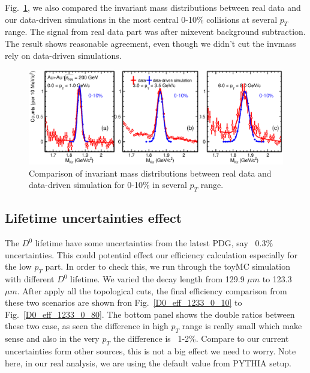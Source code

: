 Fig.~\ref{sigmal_fastsimudata_vs_data_0_10}, we also compared the invariant mass distributions between real data and our data-driven simulations in the most central 0-10\% collisions at several $p_T$ range. The signal from real data part was after mixevent background subtraction. The result shows reasonable agreement, even though we didn't cut the invmass rely on data-driven simulations.

\begin{figure}[htbp]
\centering
\includegraphics[keepaspectratio,width=1.0\textwidth,angle=0]{figure/Run14_D0HFT/sigmal_fastsimudata_vs_data_0_10}
\caption{Comparison of invariant mass distributions between real data and data-driven simulation for 0-10\% in several $p_{T}$ range.}
\label{sigmal_fastsimudata_vs_data_0_10}
\end{figure}


\subsection{Lifetime uncertainties effect} 

The $D^0$ lifetime have some uncertainties from the latest PDG, say ~0.3\% uncertainties. This could potential effect our efficiency calculation especially for the low $p_T$ part. In order to check this, we run through the toyMC simulation with different $D^0$ lifetime. We varied the decay length from 129.9 $\mu m$ to 123.3 $\mu m$. After apply all the topological cuts, the final efficiency comparison from these two scenarios are shown fron Fig.~\ref{D0_eff_1233_0_10} to Fig.~\ref{D0_eff_1233_0_80}. The bottom panel shows the double ratios between these two case, as seen the difference in high $p_T$ range is really small which make sense and also in the very $p_T$ the difference is ~1-2\%. Compare to our current uncertainties form other sources, this is not a big effect we need to worry. Note here, in our real analysis, we are using the default value from PYTHIA setup.

